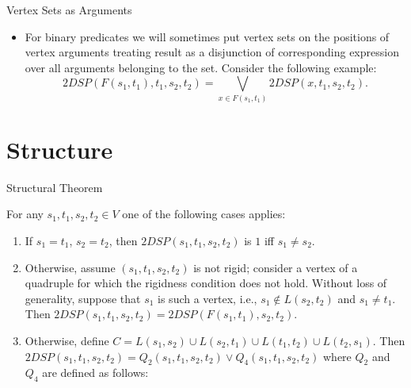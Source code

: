 \documentclass{beamer}
\begin{document}
\begin{frame}{Vertex Sets as Arguments}
    \begin{itemize}
        \item For binary predicates we will sometimes put vertex sets on the positions of vertex arguments treating result as a disjunction of corresponding expression over all arguments belonging to the set. Consider the following example:
        \begin{equation*}
            2DSP(F(s_1, t_1), t_1, s_2, t_2) = \bigvee\limits_{x \in F(s_1, t_1)} 2DSP(x, t_1, s_2, t_2).
        \end{equation*}
    \end{itemize}
\end{frame}

\section{Structure}

\begin{frame}{Structural Theorem}
    \begin{theorem}
    For any $s_1, t_1, s_2, t_2 \in V$ one of the following cases applies:
    \begin{enumerate} 
        \item If $s_1 = t_1$, $s_2 = t_2$, then $2DSP(s_1, t_1, s_2, t_2)$ is $1$ iff $s_1 \neq s_2$.
        \item Otherwise, assume $(s_1, t_1, s_2, t_2)$ is not rigid; consider a vertex of a quadruple for which the rigidness condition does not hold. Without loss of generality, suppose that $s_1$ is such a vertex, i.e., $s_1 \notin L(s_2, t_2)$ and $s_1 \neq t_1$. Then $2DSP(s_1, t_1, s_2, t_2) = 2DSP(F(s_1, t_1), s_2, t_2)$.
        \item Otherwise, define $C = L(s_1, s_2) \cup L(s_2, t_1) \cup L(t_1, t_2) \cup L(t_2, s_1)$. Then $2DSP(s_1, t_1, s_2, t_2) = Q_2(s_1, t_1, s_2, t_2) \vee Q_4(s_1, t_1, s_2, t_2)$ where $Q_2$ and $Q_4$ are defined as follows:    
    \end{enumerate}
    \end{theorem}
\end{frame}
\end{document}
